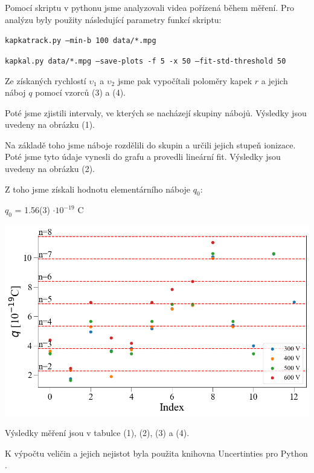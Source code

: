 \documentclass[a4paper,11pt]{article}
\begin{document}
\newpage
    \begin{minipage}[t]{0.5\textwidth}   
            Pomocí skriptu v pythonu jsme analyzovali videa pořízená během měření. Pro analýzu byly použity následující parametry funkcí skriptu: 
            \vspace{5pt}
            \par \texttt{kapkatrack.py --min-b 100 data/*.mpg}
            \vspace{5pt}
            \par \texttt{kapkal.py data/*.mpg --save-plots -f 5 -x 50 --fit-std-threshold 50}
            \vspace{5pt}
            \par Ze získaných rychlostí $\upsilon_1$ a $\upsilon_2$ jsme pak vypočítali poloměry kapek $r$ a jejich náboj $q$ pomocí vzorců (3) a (4). 
            \par Poté jsme zjistili intervaly, ve kterých se nacházejí skupiny nábojů. Výsledky jsou uvedeny na obrázku (1).
            \par Na základě toho jsme náboje rozdělili do skupin a určili jejich stupeň ionizace. Poté jsme tyto údaje vynesli do grafu a provedli lineární fit. Výsledky jsou uvedeny na obrázku (2).
            \par Z toho jsme získali hodnotu elementárního náboje $q_0$: 
            \begin{center}
                $q_0$ = 1.56(3) $\cdot 10^{-19}$ C
            \end{center}

            \vspace{10pt}           
            \par \centering
            \includegraphics[scale=0.35]{lvl}
            \captionsetup{justification=centering, font=footnotesize}
            \label{fig:lvl}
            \vspace{10pt}
            \raggedright 

            \par Výsledky měření jsou v tabulce (1), (2), (3) a (4).
            \par K výpočtu veličin a jejich nejistot byla použita knihovna Uncertinties pro Python \cite{uncertainties}.
    \end{minipage}
\end{document}
